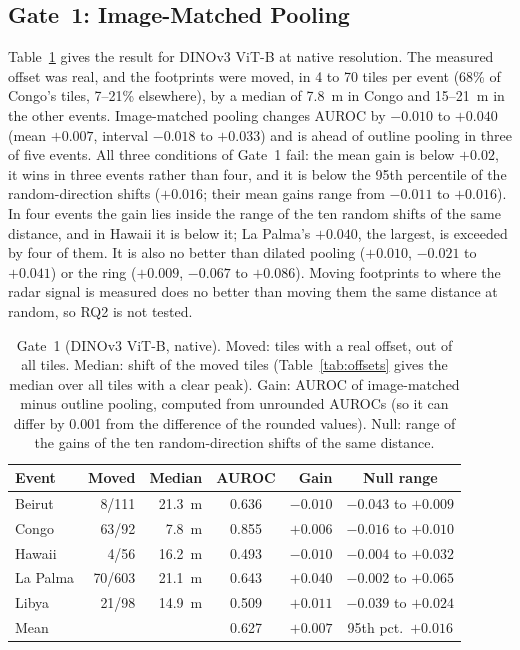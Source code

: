 \documentclass{ieeeaccess}
\begin{document}
\subsection{Gate~1: Image-Matched Pooling}
\label{sec:res-gate1}
Table~\ref{tab:gate1} gives the result for DINOv3 ViT-B at native resolution. The measured offset was real, and the footprints were moved, in 4 to 70 tiles per event (68\% of Congo's tiles, 7--21\% elsewhere), by a median of 7.8~m in Congo and 15--21~m in the other events. Image-matched pooling changes AUROC by $-0.010$ to $+0.040$ (mean $+0.007$, interval $-0.018$ to $+0.033$) and is ahead of outline pooling in three of five events. All three conditions of Gate~1 fail: the mean gain is below $+0.02$, it wins in three events rather than four, and it is below the 95th percentile of the random-direction shifts ($+0.016$; their mean gains range from $-0.011$ to $+0.016$). In four events the gain lies inside the range of the ten random shifts of the same distance, and in Hawaii it is below it; La Palma's $+0.040$, the largest, is exceeded by four of them. It is also no better than dilated pooling ($+0.010$, $-0.021$ to $+0.041$) or the ring ($+0.009$, $-0.067$ to $+0.086$). Moving footprints to where the radar signal is measured does no better than moving them the same distance at random, so RQ2 is not tested.

\begin{table}[t]
\centering
\caption{Gate~1 (DINOv3 ViT-B, native). Moved: tiles with a real offset, out of all tiles. Median: shift of the moved tiles (Table~\ref{tab:offsets} gives the median over all tiles with a clear peak). Gain: AUROC of image-matched minus outline pooling, computed from unrounded AUROCs (so it can differ by 0.001 from the difference of the rounded values). Null: range of the gains of the ten random-direction shifts of the same distance.}
\label{tab:gate1}
\footnotesize
\setlength{\tabcolsep}{2.5pt}
\begin{tabular}{@{}lrrcrc@{}}
\toprule
Event & Moved & Median & AUROC & Gain & Null range \\
\midrule
Beirut & 8/111 & 21.3~m & 0.636 & $-0.010$ & $-0.043$ to $+0.009$ \\
Congo & 63/92 & 7.8~m & 0.855 & $+0.006$ & $-0.016$ to $+0.010$ \\
Hawaii & 4/56 & 16.2~m & 0.493 & $-0.010$ & $-0.004$ to $+0.032$ \\
La Palma & 70/603 & 21.1~m & 0.643 & $+0.040$ & $-0.002$ to $+0.065$ \\
Libya & 21/98 & 14.9~m & 0.509 & $+0.011$ & $-0.039$ to $+0.024$ \\
\midrule
Mean & & & 0.627 & $+0.007$ & 95th pct.\ $+0.016$ \\
\bottomrule
\end{tabular}
\end{table}
\end{document}
